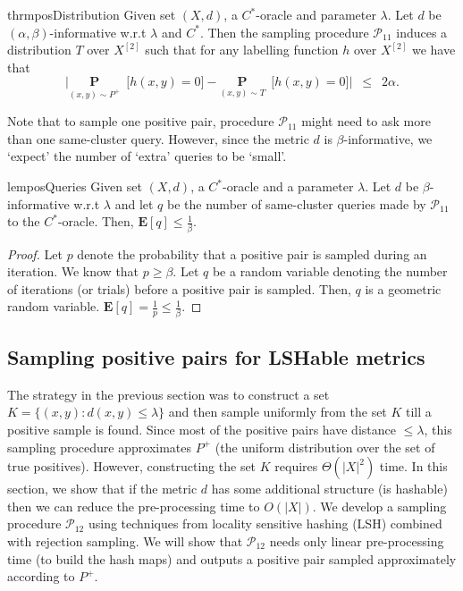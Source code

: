 \documentclass[12pt]{article}
\newcommand{\mb}{\mathbf}
\newcommand{\mc}{\mathcal}
\begin{document}
\begin{restatable}{thrm}{posDistribution}
\label{thm:posDistribution}
Given set $(X, d)$, a $C^*$-oracle and parameter $\lambda$. Let $d$ be $(\alpha, \beta)$-informative w.r.t $\lambda$ and $C^*$.  Then the sampling procedure $\mc P_{11}$ induces a distribution $T$ over $X^{[2]}$ such that for any labelling function $h$ over $X^{[2]}$ we have that $$\Big|\underset{(x, y) \sim P^+}{\mb P}\enspace \big[ h(x, y) = 0 ] - \underset{(x, y) \sim T}{\mb P}\enspace \big[ h(x, y) = 0 ]\Big|  \enspace \le \enspace 2\alpha.$$ 
\end{restatable}


\noindent Note that to sample one positive pair, procedure $\mc P_{11}$ might need to ask more than one same-cluster query. However, since the metric $d$ is $\beta$-informative, we `expect' the number of `extra' queries to be `small'. 

\begin{restatable}{lem}{posQueries}
\label{lemma:posQueries}
Given set $(X, d)$, a $C^*$-oracle and a parameter $\lambda$. Let $d$ be $\beta$-informative w.r.t $\lambda$ and let $q$ be the number of same-cluster queries made by $\mc P_{11}$ to the $C^*$-oracle. Then, $\mb E[q] \le \frac{1}{\beta}$.
\end{restatable}
\begin{proof}
Let $p$ denote the probability that a positive pair is sampled during an iteration. We know that $p \ge \beta$. Let $q$ be a random variable denoting the number of iterations (or trials) before a positive pair is sampled. Then, $q$ is a geometric random variable. $\mb E[q] = \frac{1}{p} \le \frac{1}{\beta}$.
\end{proof}

\subsection{Sampling positive pairs for LSHable metrics}
\label{section:samplingPositiveLSHable}

The strategy in the previous section was to construct a set $K = \{(x, y): d(x, y) \le \lambda\}$ and then sample uniformly from the set $K$ till a positive sample is found. Since most of the positive pairs have distance $\le \lambda$, this sampling procedure approximates $P^+$ (the uniform distribution over the set of true positives). However, constructing the set $K$ requires $\Theta(|X|^2)$ time. In this section, we show that if the metric $d$ has some additional structure (is hashable) then we can reduce the pre-processing time to $O(|X|)$. We develop a sampling procedure $\mc P_{12}$ using techniques from locality sensitive hashing (LSH) combined with rejection sampling. We will show that $\mc P_{12}$ needs only linear pre-processing time (to build the hash maps) and outputs a positive pair sampled approximately according to $P^+$.\\
\end{document}
